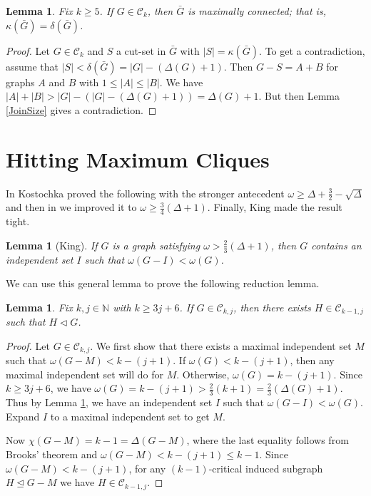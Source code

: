 \documentclass[12pt]{article}
\theoremstyle{plain}
\newtheorem{lem}[thm]{Lemma}
\theoremstyle{definition}
\theoremstyle{remark}
\newcommand{\fancy}[1]{\mathcal{#1}}
\newcommand{\C}[1]{\fancy{C}_{#1}}
\newcommand{\IN}{\mathbb{N}}
\newcommand{\card}[1]{\left|#1\right|}
\begin{document}
\begin{lem}
Fix $k \geq 5$. If $G \in \C{k}$, then $\bar{G}$ is maximally connected; that is, $\kappa(\bar{G}) = \delta(\bar{G})$.
\end{lem}
\begin{proof}
Let $G \in \C{k}$ and $S$ a cut-set in $\bar{G}$ with $\card{S} = \kappa(\bar{G})$.  To get a contradiction, assume that $\card{S} < \delta(\bar{G}) = \card{G} - (\Delta(G) + 1)$.  Then $G - S = A + B$ for graphs $A$ and $B$ with $1 \leq \card{A} \leq \card{B}$.  We have $\card{A} + \card{B} > \card{G} - (\card{G} - (\Delta(G) + 1)) = \Delta(G) + 1$.  But then Lemma \ref{JoinSize} gives a contradiction.
\end{proof}


\section{Hitting Maximum Cliques}
In \cite{kostochkaRussian} Kostochka proved the following with the stronger antecedent $\omega \geq \Delta + \frac32 - \sqrt{\Delta}$ and then in \cite{rabernhitting} we improved it to $\omega \geq \frac34(\Delta + 1)$.  Finally, King \cite{KingAXiv} made the result tight.

\begin{lem}[King]\label{HittingMaxCliques}
If $G$ is a graph satisfying $\omega > \frac23 (\Delta + 1)$, then $G$ contains an independent set $I$ such that $\omega(G - I) < \omega(G)$.
\end{lem}

We can use this general lemma to prove the following reduction lemma.

\begin{lem}\label{InductingOnC}
Fix $k, j \in \IN$ with $k \geq 3j + 6$.  If $G \in \C{k, j}$, then there exists $H \in \C{k-1, j}$
such that $H \lhd G$. 
\end{lem}
\begin{proof}
Let $G \in \C{k, j}$. We first show that there exists a maximal independent
set $M$ such that  $\omega(G - M) < k - (j + 1)$.   If $\omega(G)
< k - (j + 1)$, then any maximal independent set will do for $M$.
Otherwise, $\omega(G) = k - (j + 1)$.  Since $k \geq 3j + 6$, we have $\omega(G) = k - (j + 1) > \frac23(k + 1) = \frac23(\Delta(G) + 1)$.  Thus by Lemma
\ref{HittingMaxCliques}, we have an independent set $I$ such that
$\omega(G - I) < \omega(G)$.  Expand $I$ to a maximal independent set
to get $M$.\newline

Now $\chi(G - M) = k - 1 = \Delta(G - M)$, where the last equality
follows from Brooks' theorem and $\omega(G - M) < k - (j + 1) \leq k - 1$.  Since $\omega(G - M) < k - (j + 1)$, for any $(k - 1)$-critical induced subgraph $H \unlhd G - M$ we have $H \in \C{k - 1, j}$.
\end{proof}
\end{document}
